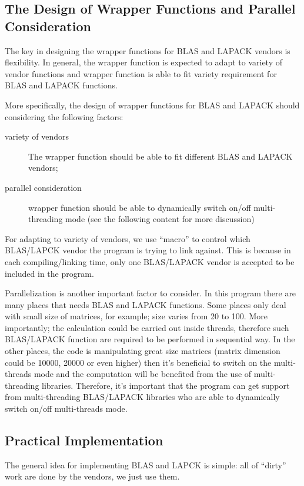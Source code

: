 \subsection{The Design of Wrapper Functions and Parallel Consideration}
%
%
%
The key in designing the wrapper functions for BLAS and LAPACK vendors
is flexibility. In general, the wrapper function is expected to adapt
to variety of vendor functions and wrapper function is able to fit
variety requirement for BLAS and LAPACK functions.

More specifically, the design of wrapper functions for BLAS and LAPACK
should considering the following factors:
\begin{description}
 \item [variety of vendors] The wrapper function should be able to fit
 different BLAS and LAPACK vendors;
 \item [parallel consideration] wrapper function should be able to 
 dynamically switch on/off multi-threading mode (see the following content
 for more discussion)
\end{description}

For adapting to variety of vendors, we use ``macro'' to control which 
BLAS/LAPCK vendor the program is trying to link against. This is because
in each compiling/linking time, only one BLAS/LAPACK vendor is accepted 
to be included in the program.

Parallelization is another important factor to consider. In this program
there are many places that needs BLAS and LAPACK functions. Some places
only deal with small size of matrices, for example; size varies from 20 
to 100. More importantly; the calculation could be carried out inside
threads, therefore such BLAS/LAPACK function are required to be performed
in sequential way. In the other places, the code is manipulating great 
size matrices (matrix dimension could be 10000, 20000 or even higher)
then it's beneficial to switch on the multi-threads mode and the computation
will be benefited from the use of multi-threading libraries. Therefore,
it's important that the program can get support from multi-threading BLAS/LAPACK 
libraries who are able to dynamically switch on/off multi-threads mode.

\subsection{Practical Implementation}
%
%
%
The general idea for implementing BLAS and LAPCK is simple: all of ``dirty''
work are done by the vendors, we just use them.


